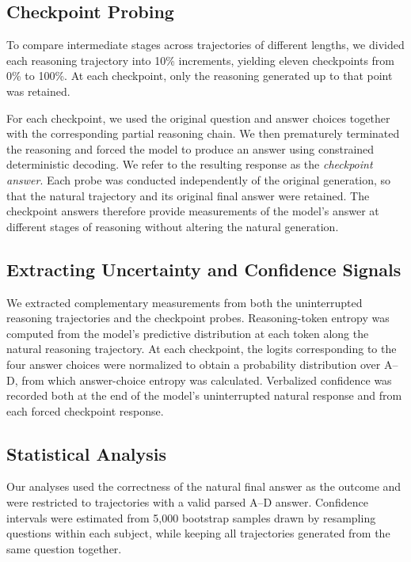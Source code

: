 \documentclass{article}
\begin{document}
\subsection{Checkpoint Probing}
\label{sec:checkpoint-probing}

To compare intermediate stages across trajectories of different lengths, we divided each reasoning trajectory into 10\% increments, yielding eleven checkpoints from 0\% to 100\%. At each checkpoint, only the reasoning generated up to that point was retained.

For each checkpoint, we used the original question and answer choices together with the corresponding partial reasoning chain. We then prematurely terminated the reasoning and forced the model to produce an answer using constrained deterministic decoding. We refer to the resulting response as the \emph{checkpoint answer}. Each probe was conducted independently of the original generation, so that the natural trajectory and its original final answer were retained. The checkpoint answers therefore provide measurements of the model's answer at different stages of reasoning without altering the natural generation.


\subsection{Extracting Uncertainty and Confidence Signals}
\label{sec:signal-extraction}

We extracted complementary measurements from both the uninterrupted reasoning trajectories and the checkpoint probes. Reasoning-token entropy was computed from the model's predictive distribution at each token along the natural reasoning trajectory. At each checkpoint, the logits corresponding to the four answer choices were normalized to obtain a probability distribution over A--D, from which answer-choice entropy was calculated. Verbalized confidence was recorded both at the end of the model's uninterrupted natural response and from each forced checkpoint response.


\subsection{Statistical Analysis}
\label{sec:analysis}

Our analyses used the correctness of the natural final answer as the outcome and were restricted to trajectories with a valid parsed A--D answer. Confidence intervals were estimated from 5,000 bootstrap samples drawn by resampling questions within each subject, while keeping all trajectories generated from the same question together.
\end{document}

